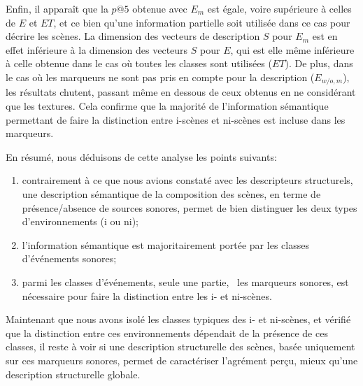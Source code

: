 Enfin, il apparaît que la $p@5$ obtenue avec $E_{m}$ est égale, voire supérieure à celles de $E$ et $ET$, et ce bien qu'une information partielle soit utilisée dans ce cas pour décrire les scènes. La dimension des vecteurs de description $S$ pour $E_m$ est en effet inférieure à la dimension des vecteurs $S$ pour $E$, qui est elle même inférieure à celle obtenue dans le cas où toutes les classes sont utilisées ($ET$). De plus, dans le cas où les marqueurs ne sont pas pris en compte pour la description ($E_{w/o,m}$), les résultats chutent, passant même en dessous de ceux obtenus en ne considérant que les textures. Cela confirme que la majorité de l'information sémantique permettant de faire la distinction entre i-scènes et ni-scènes est incluse dans les marqueurs.

En résumé, nous déduisons de cette analyse les points suivants:

\begin{enumerate}
\item contrairement à ce que nous avions constaté avec les descripteurs structurels, une description sémantique de la composition des scènes, en terme de présence/absence de sources sonores, permet de bien distinguer les deux types d'environnements (i ou ni);
\item l'information sémantique est majoritairement portée par les classes d'événements sonores;
\item parmi les classes d'événements, seule une partie, \ie~les marqueurs sonores, est nécessaire pour faire la distinction entre les i- et ni-scènes.
\end{enumerate}

Maintenant que nous avons isolé les classes typiques des i- et ni-scènes, et vérifié que la distinction entre ces environnements dépendait de la présence de ces classes, il reste à voir si une description structurelle des scènes, basée uniquement sur ces marqueurs sonores, permet de caractériser l'agrément perçu, mieux qu'une description structurelle globale. 

